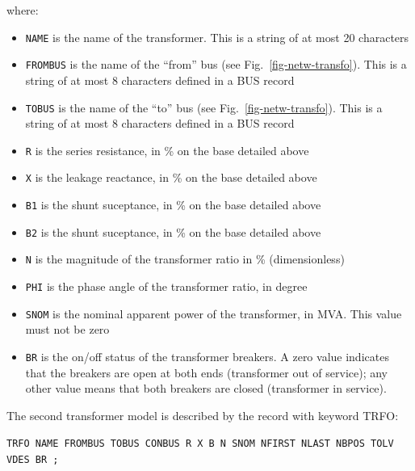 where:
\begin{itemize}
\item {\tt NAME} is the name of the transformer.  This is a string of at most 20 characters
\item {\tt FROMBUS} is the name of the ``from'' bus (see Fig.~\ref{fig-netw-transfo}). This is a string of at most 8 characters defined in a BUS record
\item {\tt TOBUS} is the name of the ``to'' bus (see Fig.~\ref{fig-netw-transfo}). This is a string of at most 8 characters defined in a BUS record
\item{\tt R} is the series resistance, in \% on the base detailed above
\item{\tt X} is the leakage reactance, in \% on the base detailed above
\item{\tt B1} is the shunt suceptance, in \% on the base detailed above
\item{\tt B2} is the shunt suceptance, in \% on the base detailed above
\item{\tt N} is the magnitude of the transformer ratio in \% (dimensionless)
\item{\tt PHI} is the phase angle of the transformer ratio, in degree
\item{\tt SNOM} is the nominal apparent power of the transformer, in MVA. This value must not be zero
\item{\tt BR} is the on/off status of the transformer breakers. A zero value indicates that the breakers are open at both ends (transformer out of service); any other value means that both breakers are closed (transformer in service).
\end{itemize}

The second transformer model is described by the record with keyword TRFO: 

\hspace*{2ex}\mbox{\tt TRFO NAME FROMBUS TOBUS CONBUS R X B N SNOM NFIRST NLAST NBPOS TOLV VDES BR ;}

